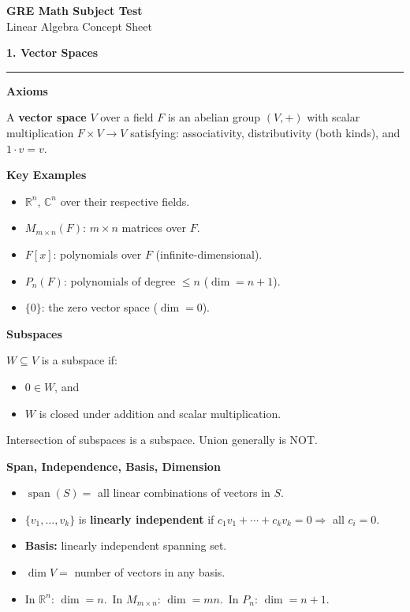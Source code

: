 \documentclass[10pt,twocolumn]{article}
\newcommand{\sect}[1]{\medskip\noindent\textbf{\large #1}\medskip\hrule\smallskip}
\newcommand{\subsect}[1]{\smallskip\noindent\textbf{#1}\par}
\DeclareMathOperator{\Span}{span}
\begin{document}
\begin{center}
{\LARGE\bfseries GRE Math Subject Test}\\[2pt]
{\Large Linear Algebra Concept Sheet}
\end{center}

\vspace{-4pt}

\sect{1. Vector Spaces}

\subsect{Axioms}
A \textbf{vector space} $V$ over a field $F$ is an abelian group $(V,+)$ with scalar multiplication $F\times V\to V$ satisfying: associativity, distributivity (both kinds), and $1\cdot v=v$.

\subsect{Key Examples}
\begin{itemize}[nosep,leftmargin=*]
\item $\mathbb{R}^n$, $\mathbb{C}^n$ over their respective fields.
\item $M_{m\times n}(F)$: $m\times n$ matrices over $F$.
\item $F[x]$: polynomials over $F$ (infinite-dimensional).
\item $P_n(F)$: polynomials of degree $\le n$ ($\dim = n+1$).
\item $\{0\}$: the zero vector space ($\dim=0$).
\end{itemize}

\subsect{Subspaces}
$W\subseteq V$ is a subspace if:
\begin{itemize}[nosep,leftmargin=*]
\item $0\in W$, and
\item $W$ is closed under addition and scalar multiplication.
\end{itemize}
Intersection of subspaces is a subspace. Union generally is NOT.

\subsect{Span, Independence, Basis, Dimension}
\begin{itemize}[nosep,leftmargin=*]
\item $\Span(S)=$ all linear combinations of vectors in $S$.
\item $\{v_1,\ldots,v_k\}$ is \textbf{linearly independent} if $c_1v_1+\cdots+c_kv_k=0 \Rightarrow$ all $c_i=0$.
\item \textbf{Basis:} linearly independent spanning set.
\item $\dim V=$ number of vectors in any basis.
\item In $\mathbb{R}^n$: $\dim=n$.\ In $M_{m\times n}$: $\dim=mn$.\ In $P_n$: $\dim=n+1$.
\end{itemize}
\end{document}
